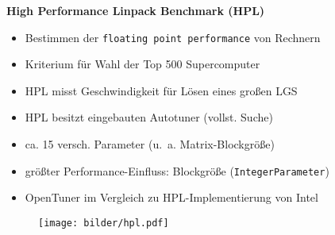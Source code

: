  \begingroup
\begin{frame}
  \textbf{High Performance Linpack Benchmark (HPL)}
  \begin{itemize}
    \item Bestimmen der \texttt{floating point performance} von Rechnern
    
    \item Kriterium für Wahl der Top 500 Supercomputer
    \item HPL misst Geschwindigkeit für Lösen eines großen LGS
    
    \item HPL besitzt eingebauten Autotuner (vollst. Suche)
    
    \item ca. 15 versch. Parameter (u.~a. Matrix-Blockgröße)
    \item größter Performance-Einfluss: Blockgröße (\texttt{IntegerParameter})
    
    
    \item OpenTuner im Vergleich zu HPL-Implementierung von Intel
    
  \end{itemize}  
\end{frame}
\endgroup

 \begingroup
\begin{frame}
    \begin{figure}[ht]
      \centering	      
      \texttt{[image: bilder/hpl.pdf]}
      \label{hpl}
    \end{figure}
\end{frame}
\endgroup
    
   
